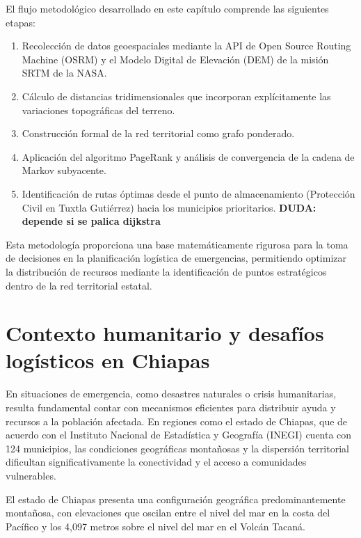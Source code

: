 \documentclass[
  spanish,
  us-letterpaper,
]{scrreprt}
\providecommand{\tightlist}{%
  \setlength{\itemsep}{0pt}\setlength{\parskip}{0pt}}
\numberwithin{equation}{section}
\begin{document}
El flujo metodológico desarrollado en este capítulo comprende las
siguientes etapas:

\begin{enumerate}
\def\labelenumi{\arabic{enumi}.}
\tightlist
\item
  Recolección de datos geoespaciales mediante la API de Open Source
  Routing Machine (OSRM) y el Modelo Digital de Elevación (DEM) de la
  misión SRTM de la NASA.
\item
  Cálculo de distancias tridimensionales que incorporan explícitamente
  las variaciones topográficas del terreno.
\item
  Construcción formal de la red territorial como grafo ponderado.
\item
  Aplicación del algoritmo PageRank y análisis de convergencia de la
  cadena de Markov subyacente.
\item
  Identificación de rutas óptimas desde el punto de almacenamiento
  (Protección Civil en Tuxtla Gutiérrez) hacia los municipios
  prioritarios. \textbf{DUDA: depende si se palica dijkstra}
\end{enumerate}

Esta metodología proporciona una base matemáticamente rigurosa para la
toma de decisiones en la planificación logística de emergencias,
permitiendo optimizar la distribución de recursos mediante la
identificación de puntos estratégicos dentro de la red territorial
estatal.

\section{Contexto humanitario y desafíos logísticos en
Chiapas}\label{contexto-humanitario-y-desafuxedos-loguxedsticos-en-chiapas}

En situaciones de emergencia, como desastres naturales o crisis
humanitarias, resulta fundamental contar con mecanismos eficientes para
distribuir ayuda y recursos a la población afectada. En regiones como el
estado de Chiapas, que de acuerdo con el Instituto Nacional de
Estadística y Geografía (INEGI) cuenta con 124 municipios, las
condiciones geográficas montañosas y la dispersión territorial
dificultan significativamente la conectividad y el acceso a comunidades
vulnerables.

El estado de Chiapas presenta una configuración geográfica
predominantemente montañosa, con elevaciones que oscilan entre el nivel
del mar en la costa del Pacífico y los 4,097 metros sobre el nivel del
mar en el Volcán Tacaná.
\end{document}
